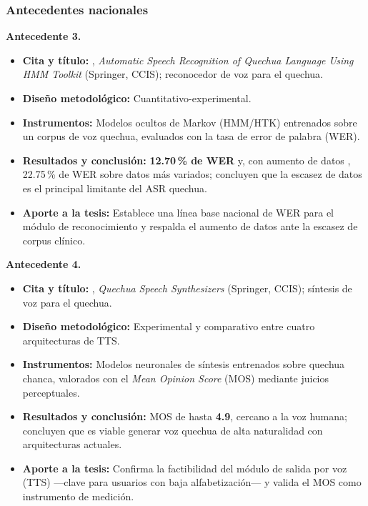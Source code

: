 \subsubsection{Antecedentes nacionales}
\begin{bloqueObsDos}
\noindent\textbf{Antecedente 3.}
\begin{itemize}\setlength{\itemsep}{1pt}
  \item \textbf{Cita y t{\'i}tulo:} \textcite{Zevallos202061}, \emph{Automatic Speech Recognition of Quechua Language Using HMM Toolkit} (Springer, CCIS); reconocedor de voz para el quechua.
  \item \textbf{Dise{\~n}o metodol{\'o}gico:} Cuantitativo-experimental.
  \item \textbf{Instrumentos:} Modelos ocultos de Markov (HMM/HTK) entrenados sobre un corpus de voz quechua, evaluados con la tasa de error de palabra (WER).
  \item \textbf{Resultados y conclusi{\'o}n:} \textbf{12.70\,\% de WER} y, con aumento de datos \parencite{Zevallos20223518}, 22.75\,\% de WER sobre datos m{\'a}s variados; concluyen que la escasez de datos es el principal limitante del ASR quechua.
  \item \textbf{Aporte a la tesis:} Establece una l{\'i}nea base nacional de WER para el m{\'o}dulo de reconocimiento y respalda el aumento de datos ante la escasez de corpus cl{\'i}nico.
\end{itemize}

\noindent\textbf{Antecedente 4.}
\begin{itemize}\setlength{\itemsep}{1pt}
  \item \textbf{Cita y t{\'i}tulo:} \textcite{HuamanCuro2026}, \emph{Quechua Speech Synthesizers} (Springer, CCIS); s{\'i}ntesis de voz para el quechua.
  \item \textbf{Dise{\~n}o metodol{\'o}gico:} Experimental y comparativo entre cuatro arquitecturas de TTS.
  \item \textbf{Instrumentos:} Modelos neuronales de s{\'i}ntesis entrenados sobre quechua chanca, valorados con el \emph{Mean Opinion Score} (MOS) mediante juicios perceptuales.
  \item \textbf{Resultados y conclusi{\'o}n:} MOS de hasta \textbf{4.9}, cercano a la voz humana; concluyen que es viable generar voz quechua de alta naturalidad con arquitecturas actuales.
  \item \textbf{Aporte a la tesis:} Confirma la factibilidad del m{\'o}dulo de salida por voz (TTS) ---clave para usuarios con baja alfabetizaci{\'o}n--- y valida el MOS como instrumento de medici{\'o}n.
\end{itemize}


\end{bloqueObsDos}
